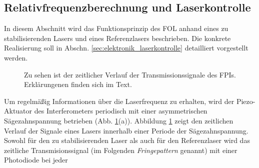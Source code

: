 \subsection{Relativfrequenzberechnung
und Laserkontrolle}\label{subsec:relativfrequenzberechnung_und_laserkontrolle}
In diesem Abschnitt wird das Funktionsprinzip des FOL anhand
eines zu stabilisierenden Lasers und eines Referenzlasers beschrieben. Die
konkrete Realisierung soll in Abschn. \ref{sec:elektronik_laserkontrolle}
detailliert vorgestellt werden.\par
\begin{figure}[h]
 	\centering
	\caption[Zeitlicher Verlauf
	FPI-Transmission]{Zu sehen ist der zeitlicher Verlauf der
	Transmissionssignale des FPIs. Erklärungenen finden sich im
	Text.}\label{fig:FPI_signal-zeitverlauf}
\end{figure}
Um regelmäßig Informationen über die Laserfrequenz zu erhalten, wird der
Piezo-Aktuator des Interferometers periodisch mit einer asymmetrischen
Sägezahnspannung betrieben (Abb. \ref{fig:FPI_signal-zeitverlauf}(a)). Abbildung
\ref{fig:FPI_signal-zeitverlauf} zeigt den zeitlichen Verlauf der Signale eines
Lasers innerhalb einer Periode der Sägezahnspannung. Sowohl für den zu
stabilisierenden Laser als auch für den Referenzlaser wird das zeitliche Transmisionssignal (im
Folgenden \textit{Fringepattern} genannt) mit einer Photodiode bei jeder
